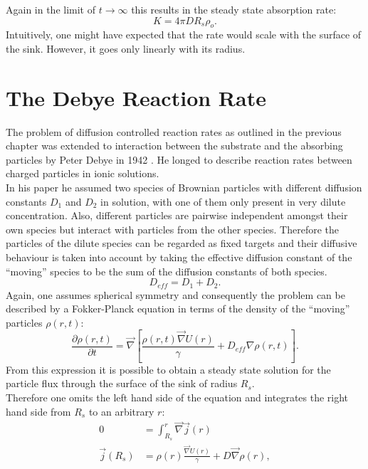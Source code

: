 Again in the limit of $t \rightarrow \infty$ this results in the steady state absorption rate:
\begin{equation}
    K = 4 \pi D R_s \rho_o.
    \label{steady state ideal rate}
\end{equation}
Intuitively, one might have expected that the rate would scale with the surface of the sink. However, it goes only linearly with its radius.
\section{The Debye Reaction Rate}
\label{The_Debye_Reaction_Rate}
The problem of diffusion controlled reaction rates as outlined in the previous chapter was extended to interaction between the substrate and the absorbing particles by Peter Debye in 1942 \cite{Debye1942}. He longed to describe reaction rates between charged particles in ionic solutions. \\
In his paper he assumed two species of Brownian particles with different diffusion constants $D_{1}$ and $D_{2}$ in solution, with one of them only present in very dilute concentration. Also, different particles are pairwise independent amongst their own species but interact with particles from the other species. Therefore the particles of the dilute species can be regarded as fixed targets and their diffusive behaviour is taken into account by taking the effective diffusion constant of the ``moving'' species to be the sum of the diffusion constants of both species. 
\begin{equation}
    D_{eff} = D_{1} + D_{2}.
\end{equation}
Again, one assumes spherical symmetry and consequently the problem can be described by a Fokker-Planck equation in terms of the density of the ``moving'' particles $\rho(r,t)$:
\begin{equation}
    \frac{\partial \rho(r,t)}{\partial t} = \vec \nabla \left[ \frac{\rho(r,t)\vec \nabla U(r)}{\gamma} + D_{eff} \nabla \rho(r,t) \right].
    \label{fpe_debye}
\end{equation}
From this expression it is possible to obtain a steady state solution for the particle flux through the surface of the sink of radius $R_s$. \\
Therefore one omits the left hand side of the equation and integrates the right hand side from $R_s$ to an arbitrary $r$:
\begin{align}
    0 &= \int_{R_s}^{r} \vec \nabla \vec j(r) \nonumber \\
    \vec j(R_s) &=  \rho(r)\frac{\vec \nabla U(r)}{\gamma} + D \vec \nabla \rho(r),
\end{align}
